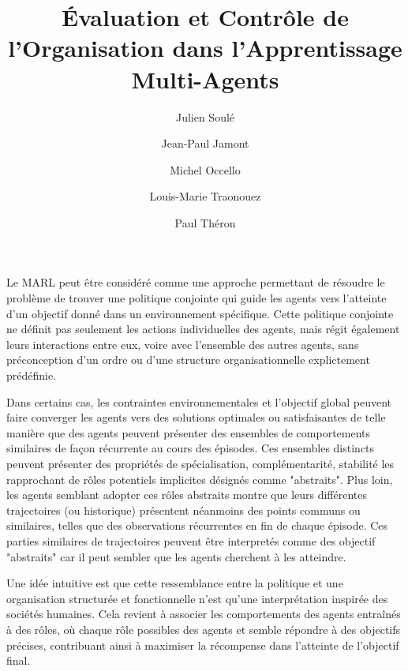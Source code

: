 \documentclass[sigconf,anonymous]{aamas}
\title[AAMAS-2025 CybMASDE]{Évaluation et Contrôle de l'Organisation dans l'Apprentissage Multi-Agents}
\author{Julien Soulé}
\affiliation{
  \institution{Univ. Grenoble Alpes}
  \city{Valence}
  \country{France}}
\author{Jean-Paul Jamont}
\affiliation{
  \institution{Univ. Grenoble Alpes}
  \city{Valence}
  \country{France}}
\author{Michel Occello}
\affiliation{
  \institution{Univ. Grenoble Alpes}
  \city{Valence}
  \country{France}}
\author{Louis-Marie Traonouez}
\affiliation{
  \institution{Thales Land and Air Systems, BU IAS}
  \city{Rennes}
  \country{France}}
\author{Paul Théron}
\affiliation{
  \institution{AICA IWG}
  \city{La Guillermie}
  \country{France}}
\begin{document}

\pagestyle{fancy}
\fancyhead{}


\maketitle



Le MARL peut être considéré comme une approche permettant de résoudre le problème de trouver une politique conjointe qui guide les agents vers l'atteinte d'un objectif donné dans un environnement spécifique.
Cette politique conjointe ne définit pas seulement les actions individuelles des agents, mais régit également leurs interactions entre eux, voire avec l'ensemble des autres agents, sans préconception d'un ordre ou d'une structure organisationnelle explictement prédéfinie.

Dans certains cas, les contraintes environnementales et l'objectif global peuvent faire converger les agents vers des solutions optimales ou satisfaisantes de telle manière que des agents peuvent présenter des ensembles de comportements similaires de façon récurrente au cours des épisodes. Ces ensembles distincts peuvent présenter des propriétés de spécialisation, complémentarité, stabilité les rapprochant de rôles potentiels implicites désignés comme "abstraits". Plus loin, les agents semblant adopter ces rôles abstraits montre que leurs différentes trajectoires (ou historique) présentent néanmoins des points communs ou similaires, telles que des observations récurrentes en fin de chaque épisode. Ces parties similaires de trajectoires peuvent être interpretés comme des objectif "abstraits" car il peut sembler que les agents cherchent à les atteindre.



Une idée intuitive est que cette ressemblance entre la politique et une organisation structurée et fonctionnelle n'est qu'une interprétation inspirée des sociétés humaines. Cela revient à associer les comportements des agents entraînés à des rôles, où chaque rôle possibles des agents et semble répondre à des objectifs précises, contribuant ainsi à maximiser la récompense dans l'atteinte de l'objectif final.
\end{document}
